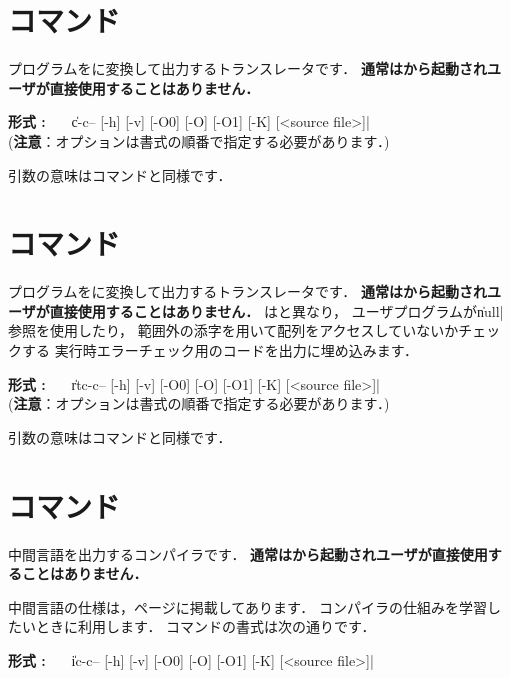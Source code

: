 \section{{\ccmmc}コマンド}
\label{command:ccmmc}

{\cmm}プログラムを{\cl}に変換して出力するトランスレータです．
{\bf 通常は{\cmc}から起動されユーザが直接使用することはありません．}

\begin{flushleft}
{\bf 形式 : }~~~\|c-c-- [-h] [-v] [-O0] [-O] [-O1] [-K] [<source file>]|\\
({\bf 注意}：オプションは書式の順番で指定する必要があります．)
\end{flushleft}

引数の意味は{\cmmc}コマンドと同様です．

\section{{\rtccmmc}コマンド}
\label{command:rtccmmc}

{\cmm}プログラムを{\cl}に変換して出力するトランスレータです．
{\bf 通常は{\cmc}から起動されユーザが直接使用することはありません．}
{\rtccmmc}は{\ccmmc}と異なり，
ユーザプログラムが\|null|参照を使用したり，
範囲外の添字を用いて配列をアクセスしていないかチェックする
実行時エラーチェック用のコードを出力に埋め込みます．

\begin{flushleft}
{\bf 形式 : }~~~\|rtc-c-- [-h] [-v] [-O0] [-O] [-O1] [-K] [<source file>]|\\
({\bf 注意}：オプションは書式の順番で指定する必要があります．)
\end{flushleft}

引数の意味は{\cmmc}コマンドと同様です．

\section{{\icmmc}コマンド}
\label{command:icmmc}

中間言語を出力する{\cmm}コンパイラです．
{\bf 通常は{\cmi}から起動されユーザが直接使用することはありません．}

中間言語の仕様は，\pageref{app:vm}ページに掲載してあります．
コンパイラの仕組みを学習したいときに利用します．
{\icmmc}コマンドの書式は次の通りです．

\begin{flushleft}
{\bf 形式 : }~~~\|ic-c-- [-h] [-v] [-O0] [-O] [-O1] [-K] [<source file>]|
\end{flushleft}

